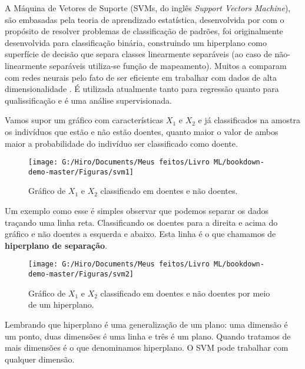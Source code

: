\documentclass[
]{book}
\begin{document}
A Máquina de Vetores de Suporte (SVMs, do inglês \emph{Support Vectors Machine}), são embasadas pela teoria de aprendizado estatística, desenvolvida por \citet{vapnik2013nature} com o propósito de resolver problemas de classificação de padrões, foi originalmente desenvolvida para classificação binária, construindo um hiperplano como superfície de decisão que separa classes linearmente separáveis (ao caso de não-linearmente separáveis utiliza-se função de mapeamento). Muitos a comparam com redes neurais pelo fato de ser eficiente em trabalhar com dados de alta dimensionalidade \citep{sung2003identifying, ding2001multi}. É utilizada atualmente tanto para regressão quanto para qualissificação e é uma análise supervisionada.

Vamos supor um gráfico com características \(X_1\) e \(X_2\) e já classificados na amostra os indivíduos que estão e não estão doentes, quanto maior o valor de ambos maior a probabilidade do indivíduo ser classificado como doente.

\begin{figure}

{\centering \texttt{[image: G:/Hiro/Documents/Meus feitos/Livro ML/bookdown-demo-master/Figuras/svm1]} 

}

\caption{Gráfico de \(X_1\) e \(X_2\) classificado em doentes e não doentes.}\label{fig:svm1}
\end{figure}



Um exemplo como esse é simples observar que podemos separar os dados traçando uma linha reta. Classificando os doentes para a direita e acima do gráfico e não doentes a esquerda e abaixo. Esta linha é o que chamamos de \textbf{hiperplano de separação}.

\begin{figure}

{\centering \texttt{[image: G:/Hiro/Documents/Meus feitos/Livro ML/bookdown-demo-master/Figuras/svm2]} 

}

\caption{Gráfico de \(X_1\) e \(X_2\) classificado em doentes e não doentes por meio de um hiperplano.}\label{fig:svm2}
\end{figure}



Lembrando que hiperplano é uma generalização de um plano: uma dimensão é um ponto, duas dimensões é uma linha e três é um plano. Quando tratamos de mais dimensões é o que denominamos hiperplano. O SVM pode trabalhar com qualquer dimensão.
\end{document}
